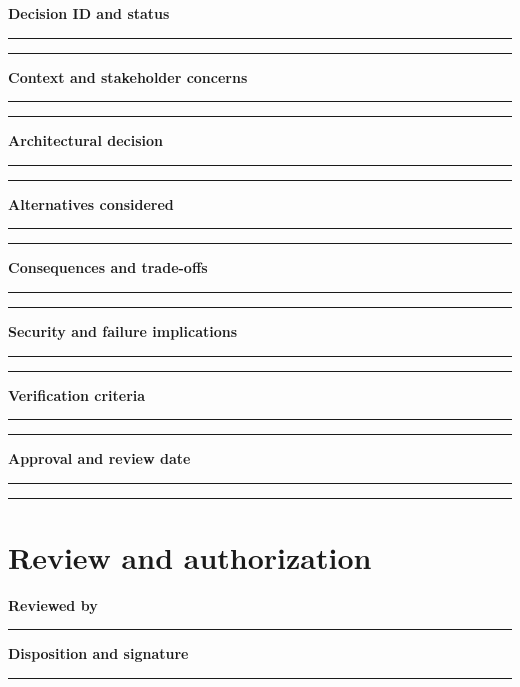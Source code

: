 \documentclass[10pt,letterpaper]{article}
\begin{document}
\textbf{Decision ID and status}\par
\noindent\rule{\linewidth}{0.35pt}\par\vspace{0.7em}
\noindent\rule{\linewidth}{0.35pt}\par\vspace{0.7em}
\textbf{Context and stakeholder concerns}\par
\noindent\rule{\linewidth}{0.35pt}\par\vspace{0.7em}
\noindent\rule{\linewidth}{0.35pt}\par\vspace{0.7em}
\textbf{Architectural decision}\par
\noindent\rule{\linewidth}{0.35pt}\par\vspace{0.7em}
\noindent\rule{\linewidth}{0.35pt}\par\vspace{0.7em}
\textbf{Alternatives considered}\par
\noindent\rule{\linewidth}{0.35pt}\par\vspace{0.7em}
\noindent\rule{\linewidth}{0.35pt}\par\vspace{0.7em}
\textbf{Consequences and trade-offs}\par
\noindent\rule{\linewidth}{0.35pt}\par\vspace{0.7em}
\noindent\rule{\linewidth}{0.35pt}\par\vspace{0.7em}
\textbf{Security and failure implications}\par
\noindent\rule{\linewidth}{0.35pt}\par\vspace{0.7em}
\noindent\rule{\linewidth}{0.35pt}\par\vspace{0.7em}
\textbf{Verification criteria}\par
\noindent\rule{\linewidth}{0.35pt}\par\vspace{0.7em}
\noindent\rule{\linewidth}{0.35pt}\par\vspace{0.7em}
\textbf{Approval and review date}\par
\noindent\rule{\linewidth}{0.35pt}\par\vspace{0.7em}
\noindent\rule{\linewidth}{0.35pt}\par\vspace{0.7em}
\section{Review and authorization}
\textbf{Reviewed by}\par
\noindent\rule{\linewidth}{0.35pt}\par\vspace{0.7em}
\textbf{Disposition and signature}\par
\noindent\rule{\linewidth}{0.35pt}\par\vspace{0.7em}
\end{document}
